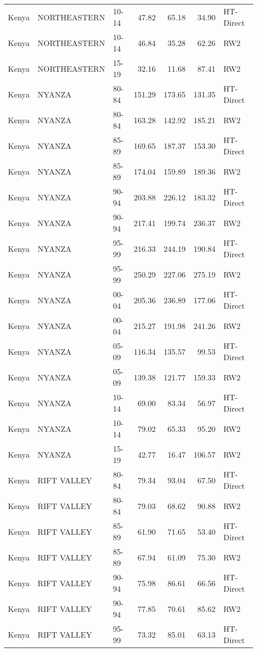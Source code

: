 \begin{longtable}{lllrrrl}
  Kenya & NORTHEASTERN & 10-14 & 47.82 & 65.18 & 34.90 & HT-Direct \\ 
  Kenya & NORTHEASTERN & 10-14 & 46.84 & 35.28 & 62.26 & RW2 \\ 
  Kenya & NORTHEASTERN & 15-19 & 32.16 & 11.68 & 87.41 & RW2 \\ 
  Kenya & NYANZA & 80-84 & 151.29 & 173.65 & 131.35 & HT-Direct \\ 
  Kenya & NYANZA & 80-84 & 163.28 & 142.92 & 185.21 & RW2 \\ 
  Kenya & NYANZA & 85-89 & 169.65 & 187.37 & 153.30 & HT-Direct \\ 
  Kenya & NYANZA & 85-89 & 174.04 & 159.89 & 189.36 & RW2 \\ 
  Kenya & NYANZA & 90-94 & 203.88 & 226.12 & 183.32 & HT-Direct \\ 
  Kenya & NYANZA & 90-94 & 217.41 & 199.74 & 236.37 & RW2 \\ 
  Kenya & NYANZA & 95-99 & 216.33 & 244.19 & 190.84 & HT-Direct \\ 
  Kenya & NYANZA & 95-99 & 250.29 & 227.06 & 275.19 & RW2 \\ 
  Kenya & NYANZA & 00-04 & 205.36 & 236.89 & 177.06 & HT-Direct \\ 
  Kenya & NYANZA & 00-04 & 215.27 & 191.98 & 241.26 & RW2 \\ 
  Kenya & NYANZA & 05-09 & 116.34 & 135.57 & 99.53 & HT-Direct \\ 
  Kenya & NYANZA & 05-09 & 139.38 & 121.77 & 159.33 & RW2 \\ 
  Kenya & NYANZA & 10-14 & 69.00 & 83.34 & 56.97 & HT-Direct \\ 
  Kenya & NYANZA & 10-14 & 79.02 & 65.33 & 95.20 & RW2 \\ 
  Kenya & NYANZA & 15-19 & 42.77 & 16.47 & 106.57 & RW2 \\ 
  Kenya & RIFT VALLEY & 80-84 & 79.34 & 93.04 & 67.50 & HT-Direct \\ 
  Kenya & RIFT VALLEY & 80-84 & 79.03 & 68.62 & 90.88 & RW2 \\ 
  Kenya & RIFT VALLEY & 85-89 & 61.90 & 71.65 & 53.40 & HT-Direct \\ 
  Kenya & RIFT VALLEY & 85-89 & 67.94 & 61.09 & 75.30 & RW2 \\ 
  Kenya & RIFT VALLEY & 90-94 & 75.98 & 86.61 & 66.56 & HT-Direct \\ 
  Kenya & RIFT VALLEY & 90-94 & 77.85 & 70.61 & 85.62 & RW2 \\ 
  Kenya & RIFT VALLEY & 95-99 & 73.32 & 85.01 & 63.13 & HT-Direct \\ 

\end{longtable}
